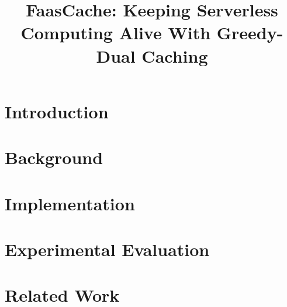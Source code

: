 \documentclass[pageno]{jpaper}
\begin{document}

\title{FaasCache: Keeping Serverless Computing Alive With Greedy-Dual Caching}

\date{}

\author{}

\maketitle 

\thispagestyle{empty}

\begin{abstract}

\end{abstract}


\section{Introduction}
\vspace*{\subsecspace}
 



\section{Background}
\vspace*{\subsecspace}
 







\section{Implementation}
\vspace*{\subsecspace}


\section{Experimental Evaluation}


\section{Related Work}





%


\end{document}
